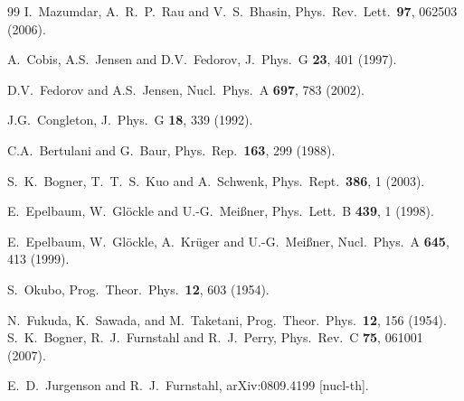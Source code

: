 \documentclass[aps,rmp,nofootinbib,twocolumn,floatfix]{revtex4}
\begin{document}
\begin{thebibliography}{99}
  I.~Mazumdar, A.~R.~P.~Rau and V.~S.~Bhasin,
  Phys.\ Rev.\ Lett.\  {\bf 97}, 062503 (2006).


A.~Cobis, A.S.~Jensen and D.V.~Fedorov,
J.\ Phys.\ G {\bf 23}, 401 (1997).

D.V.~Fedorov and A.S.~Jensen,
Nucl.\ Phys.\ A {\bf 697}, 783 (2002).

J.G.~Congleton,
J.\ Phys.\ G {\bf 18}, 339 (1992).

C.A.~Bertulani and G.~Baur, Phys.\ Rep.\ {\bf 163}, 299 (1988).

  S.~K.~Bogner, T.~T.~S.~Kuo and A.~Schwenk, 
  Phys.\ Rept.\  {\bf 386}, 1 (2003).

  E.~Epelbaum, W.~Gl\"ockle and U.-G.~Mei\ss ner,
  Phys.\ Lett.\  B {\bf 439}, 1 (1998).

  E.~Epelbaum, W.~Gl\"ockle, A.~Kr\"uger and U.-G.~Mei{\ss}ner, 
  Nucl.\ Phys.\  A {\bf 645}, 413 (1999).
 
S.~Okubo, Prog.\ Theor.\ Phys.\ {\bf 12}, 603 (1954).

N.~Fukuda, K.~Sawada, and M.~Taketani, Prog.\ Theor.\ Phys.\ {\bf 12}, 
156 (1954).
  S.~K.~Bogner, R.~J.~Furnstahl and R.~J.~Perry, 
  Phys.\ Rev.\ C {\bf 75}, 061001 (2007).
 
  E.~D.~Jurgenson and R.~J.~Furnstahl,
  arXiv:0809.4199 [nucl-th].


\end{thebibliography}
\end{document}
